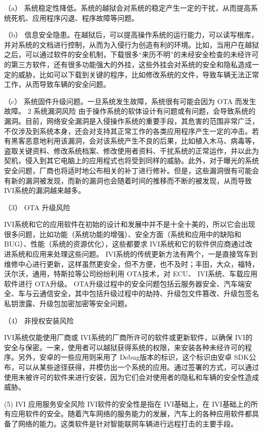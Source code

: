 （a） 系统稳定性降低。系统的越狱会对系统的稳定产生一定的干扰，从而提高系统死机、应用程序闪退、程序故障等问题。

（b） 信息安全隐患。在越狱后，可以提高操作系统的运行能力，可以读写根库，并对系统的文档进行控制，从而为入侵行为创造有利的环境。比如，当用户在越狱之后，可以通过软件的安全机制，下载很多“来历不明”的未经安全检查的未经许可的第三方软件，还有很多功能强大的外挂，这些外挂会对系统的安全和隐私造成一定的威胁，比如可以下载到关键的程序，比如修改系统的文件，导致车辆无法正常工作，从而导致车辆的安全问题。 

（c） 系统固件升级问题。一旦系统发生故障，系统很有可能会因为 OTA 而发生故障。
2 系统漏洞风险    
由于操作系统的软体设计有问题或有问题，会导致系统的漏洞。目前，网络安全漏洞是入侵操作系统的重要手段，其危害的范围非常广泛，不仅涉及到系统本身，还会对支持其正常工作的各类应用程序产生一定的冲击。若有黑客恶意地利用该漏洞，会对该系统产生不良的后果，比如植入木马、病毒等，盗取关键资料、修改系统档案、修改使用者资料、干扰系统的正常运作，并以此为契机，侵入到其它电脑上的应用程式也将受到同样的威胁。此外，对于曝光的系统安全问题，厂商也将适时地公布相关的补丁进行修补。但是，这些漏洞很有可能会有新的漏洞被发现，而新的漏洞也会随着时间的推移而不断的被发现，从而导致 IVI系统的漏洞越来越多。

（3） OTA 升级风险 

IVI系统和它的应用软件在初始的设计和发展中并不是十全十美的，所以它会出现很多问题，比如功能（系统功能的增强）、安全方面（系统和应用中的缺陷和 BUG）、性能（系统的资源优化），这些都要求 IVI系统和它的软件供应商通过改进系统和应用来处理这些问题。
IVI系统的传统更新方法有两个，一是直接驾车到维修中心进行更新，这样虽然更安全，但不方便，也不及时；丰田，大众，福特，沃尔沃，通用，特斯拉等公司纷纷利用 OTA技术，对 ECU、 IVI系统、车载应用软件进行 OTA升级。
OTA升级过程中的安全问题包括云服务器安全、汽车端安全、车与云通信安全，其中包括升级过程中的劫持、升级包文件篡改、升级包签名私钥泄露、升级包加密加密等安全问题。

（4） 非授权安装风险 

IVI系统仅能使用厂商或 IVI系统的厂商所许可的软件或更新软件，以确保 IVI的安全与保密。一来，使用者可以越狱获得系统的权限，来安装各种未经许可的程序。另外，安卓的一些应用则采用了 Debug版本的标识，这个标识由安卓 SDK公布，可以从某些途径获得，并模仿出一个系统的应用。通过签署的方式，可以通过使用未被许可的软件来进行安装，因为它们会对使用者的隐私和车辆的安全性造成威胁。 

(5) IVI 应用服务安全风险 
IVI软件的安全性是指在 IVI基础上，在 IVI基础上的所有应用软件的安全。随着汽车网络的服务能力的发展，汽车上的各种应用软件都具备了网络的能力。这类软件是针对智能联网车辆进行远程打击的主要手段。

